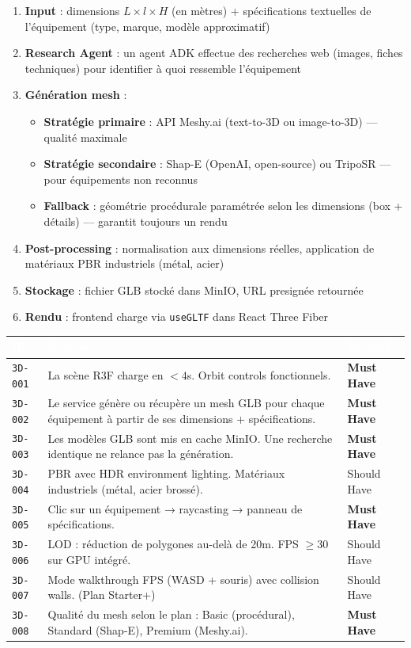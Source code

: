 \documentclass[12pt,a4paper]{article}
\newcommand{\req}[1]{\texttt{\textcolor{daedalusblue}{#1}}}
\newcommand{\musthave}{\cellcolor{musthave}\textbf{Must Have}}
\newcommand{\shouldhave}{\cellcolor{shouldhave}Should Have}
\begin{document}
\begin{enumerate}
  \item \textbf{Input} : dimensions $L \times l \times H$ (en mètres) + spécifications textuelles de l'équipement (type, marque, modèle approximatif)
  \item \textbf{Research Agent} : un agent ADK effectue des recherches web (images, fiches techniques) pour identifier à quoi ressemble l'équipement
  \item \textbf{Génération mesh} : 
    \begin{itemize}
      \item \textbf{Stratégie primaire} : API Meshy.ai (text-to-3D ou image-to-3D) — qualité maximale
      \item \textbf{Stratégie secondaire} : Shap-E (OpenAI, open-source) ou TripoSR — pour équipements non reconnus
      \item \textbf{Fallback} : géométrie procédurale paramétrée selon les dimensions (box + détails) — garantit toujours un rendu
    \end{itemize}
  \item \textbf{Post-processing} : normalisation aux dimensions réelles, application de matériaux PBR industriels (métal, acier)
  \item \textbf{Stockage} : fichier GLB stocké dans MinIO, URL presignée retournée
  \item \textbf{Rendu} : frontend charge via \texttt{useGLTF} dans React Three Fiber
\end{enumerate}

\begin{tabularx}{\textwidth}{|l|X|l|}
\hline
\rowcolor{tablehead}\textcolor{white}{\textbf{ID}} & \textcolor{white}{\textbf{Exigence}} & \textcolor{white}{\textbf{Priorité}} \\
\hline
\req{3D-001} & La scène R3F charge en $< 4$s. Orbit controls fonctionnels. & \musthave \\
\hline
\req{3D-002} & Le service génère ou récupère un mesh GLB pour chaque équipement à partir de ses dimensions + spécifications. & \musthave \\
\hline
\req{3D-003} & Les modèles GLB sont mis en cache MinIO. Une recherche identique ne relance pas la génération. & \musthave \\
\hline
\req{3D-004} & PBR avec HDR environment lighting. Matériaux industriels (métal, acier brossé). & \shouldhave \\
\hline
\req{3D-005} & Clic sur un équipement → raycasting → panneau de spécifications. & \musthave \\
\hline
\req{3D-006} & LOD : réduction de polygones au-delà de 20m. FPS $\geq 30$ sur GPU intégré. & \shouldhave \\
\hline
\req{3D-007} & Mode walkthrough FPS (WASD + souris) avec collision walls. (Plan Starter+) & \shouldhave \\
\hline
\req{3D-008} & Qualité du mesh selon le plan : Basic (procédural), Standard (Shap-E), Premium (Meshy.ai). & \musthave \\
\hline
\end{tabularx}
\end{document}
